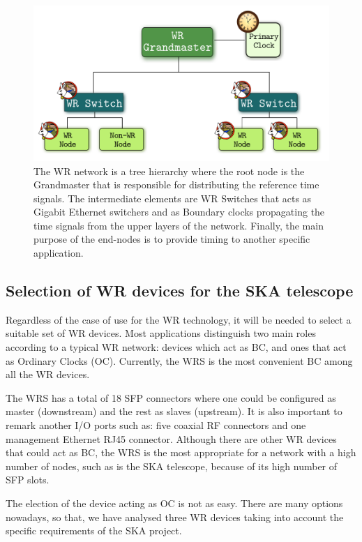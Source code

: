 \begin{figure}[H]
	\centering
	\includegraphics[scale=0.4]{img/wr_hierarchy}
	\caption{The WR network is a tree hierarchy where the root node is the Grandmaster that is responsible for distributing the reference time signals. The intermediate elements are WR Switches that acts as Gigabit Ethernet switchers and as Boundary clocks propagating the time signals from the upper layers of the network. Finally, the main purpose of the end-nodes is to provide timing to another specific application.}
	\label{fig:wr_hierarchy}
\end{figure}

\subsection{Selection of WR devices for the SKA telescope} 
\label{subsec:wr-dev}

Regardless of the case of use for the WR technology, it will be needed to 
select a suitable set of WR devices. Most applications distinguish two main 
roles according to a typical WR network: devices which act as BC, and ones 
that act as Ordinary Clocks (OC). Currently, the WRS \cite{ohwr:wrs} is the 
most convenient BC among all the WR devices. 

The WRS has a total of 18 SFP connectors where one could be configured as 
master (downstream) and the rest as slaves (upstream). It is also important to 
remark another I/O ports such as: five coaxial RF connectors and one management 
Ethernet RJ45 connector. Although there are other WR devices that could act as 
BC, the WRS is the most appropriate for a network with a high number of nodes, 
such as is the SKA telescope, because of its high number of SFP slots.

The election of the device acting as OC is not as easy. There are many options 
nowadays, so that, we have analysed three WR devices taking into account the 
specific requirements of the SKA project.

